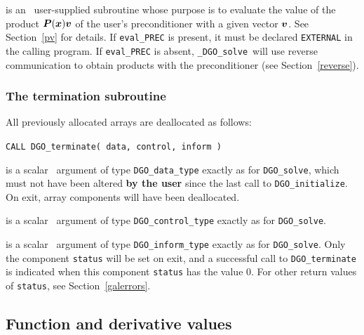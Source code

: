 \documentclass{galahad}
\newcommand{\packagename}{DGO}
\newcommand{\fullpackagename}{\libraryname\_\packagename}
\newcommand{\solver}{{\tt \fullpackagename\_solve}}
\begin{document}
\begin{description}
 is an \optional\
user-supplied subroutine whose purpose is to evaluate the value of the
product ${\bm{P}}({\bm{x}}){\bm{v}}$ of the user's preconditioner with a given vector
${\bm{v}}$. See Section~\ref{pv} for details.
If {\tt eval\_PREC} is present,
it must be declared {\tt EXTERNAL} in the calling program.
If {\tt eval\_PREC} is absent, \solver\ will use reverse communication to
obtain products with the preconditioner (see Section~\ref{reverse}).

\end{description}


\subsubsection{The  termination subroutine}
All previously allocated arrays are deallocated as follows:
\vspace*{1mm}

\hspace{8mm}
{\tt CALL \packagename\_terminate( data, control, inform )}

\vspace*{-1mm}
\begin{description}

 is a scalar \intentinout\ argument of type
{\tt \packagename\_data\_type}
exactly as for
{\tt \packagename\_solve},
which must not have been altered {\bf by the user} since the last call to
{\tt \packagename\_initialize}.
On exit, array components will have been deallocated.

 is a scalar \intentin\ argument of type
{\tt \packagename\_control\_type}
exactly as for
{\tt \packagename\_solve}.

 is a scalar \intentout\ argument of type
{\tt \packagename\_inform\_type}
exactly as for
{\tt \packagename\_solve}.
Only the component {\tt status} will be set on exit, and a
successful call to
{\tt \packagename\_terminate}
is indicated when this  component {\tt status} has the value 0.
For other return values of {\tt status}, see Section~\ref{galerrors}.

\end{description}


\subsection{Function and derivative values\label{fdv}}
\end{document}
